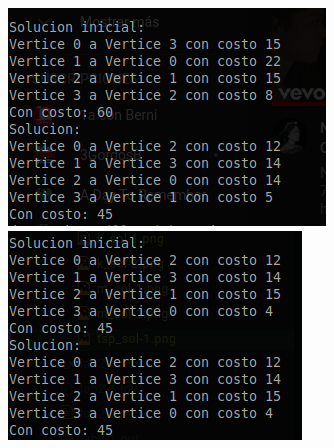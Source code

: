 \documentclass[10pt]{article}
\begin{document}
\begin{center}
  \includegraphics[scale=0.5]{imgs/tsp_sol-1.png}\\
  \includegraphics[scale=0.5]{imgs/tsp_sol-2.png}
\end{center}
\end{document}
